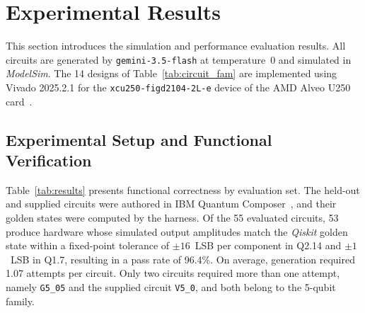 \documentclass[conference]{IEEEtran}
\begin{document}
\section{Experimental Results}
\label{sec:results}
This section introduces the simulation and performance evaluation results. All circuits are generated by \texttt{gemini-3.5-flash} at temperature~0
and simulated in \textit{ModelSim}. The 14 designs of Table~\ref{tab:circuit_fam} are implemented using Vivado 2025.2.1 for the
\texttt{xcu250-figd2104-2L-e} device of the AMD Alveo U250 card~\cite{yang2024integrated}.

\subsection{Experimental Setup and Functional Verification}
\label{subsec:correctness}
Table~\ref{tab:results} presents functional correctness by evaluation set.
The held-out and supplied circuits were authored in IBM Quantum
Composer~\cite{composer}, and their golden states were computed by the
harness. Of the 55 evaluated circuits, 53 produce hardware whose simulated
output amplitudes match the \textit{Qiskit} golden state within a fixed-point
tolerance of $\pm16$~LSB per component in Q2.14 and $\pm1$~LSB in Q1.7,
resulting in a pass rate of 96.4\%. On average, generation required
1.07 attempts per circuit. Only two circuits required more than
one attempt, namely \texttt{G5\_05} and the supplied circuit
\texttt{V5\_0}, and both belong to the 5-qubit family.
\end{document}
